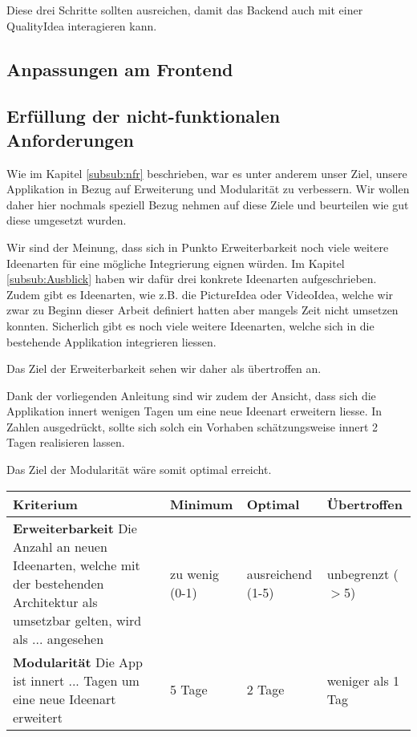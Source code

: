 Diese drei Schritte sollten ausreichen, damit das Backend auch mit einer QualityIdea interagieren kann. 

\subsection{Anpassungen am Frontend}

\subsection{Erfüllung der nicht-funktionalen Anforderungen} 
Wie im Kapitel \ref{subsub:nfr} beschrieben, war es unter anderem unser Ziel, unsere Applikation in Bezug auf Erweiterung und Modularität zu verbessern. Wir wollen daher hier nochmals speziell Bezug nehmen auf diese Ziele und beurteilen wie gut diese umgesetzt wurden.

Wir sind der Meinung, dass sich in Punkto Erweiterbarkeit noch viele weitere Ideenarten für eine mögliche Integrierung eignen würden. Im Kapitel \ref{subsub:Ausblick} haben wir dafür drei konkrete Ideenarten aufgeschrieben. Zudem gibt es Ideenarten, wie z.B. die PictureIdea oder VideoIdea, welche wir zwar zu Beginn dieser Arbeit definiert hatten aber mangels Zeit nicht umsetzen konnten. Sicherlich gibt es noch viele weitere Ideenarten, welche sich in die bestehende Applikation integrieren liessen.

Das Ziel der Erweiterbarkeit sehen wir daher als übertroffen an.

Dank der vorliegenden Anleitung sind wir zudem der Ansicht, dass sich die Applikation innert wenigen Tagen um eine neue Ideenart erweitern liesse. In Zahlen ausgedrückt, sollte sich solch ein Vorhaben schätzungsweise innert 2 Tagen realisieren lassen. 

Das Ziel der Modularität wäre somit optimal erreicht.

\begin{center}
    \begin{tabular}{ | p{6cm} | p{2.5cm} | p{2.5cm} | p{2.5cm} |}
    	\hline
    Kriterium & Minimum & Optimal & Übertroffen \\ 
    	\hline
    \textbf{Erweiterbarkeit} \newline Die Anzahl an neuen Ideenarten, welche mit der bestehenden Architektur als umsetzbar gelten, wird als ... angesehen & zu wenig (0-1) & ausreichend (1-5) & unbegrenzt ($>$5)\\
    	\hline
    \textbf{Modularität} \newline Die App ist innert ... Tagen um eine neue Ideenart erweitert & 5 Tage & 2 Tage & weniger als 1 Tag \\
    	\hline
    \end{tabular}
\end{center}

